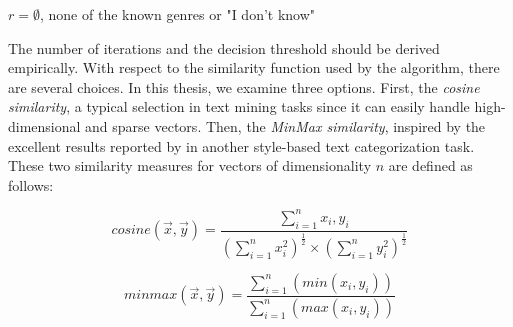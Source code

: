 \begin{algorithm}[t]
\caption{The \textit{RFSE} algorithm.}\label{chap:openset:sec:alg:RFS-Ensemble}

{
      $r = \emptyset$, none of the known genres or "I don't know"\;
}
\end{algorithm}

The number of iterations and the decision threshold should be derived empirically. With respect to the similarity function used by the algorithm, there are several choices. In this thesis, we examine three options. First, the \textit{cosine similarity}, a typical selection in text mining tasks since it can easily handle high-dimensional and sparse vectors. Then, the \textit{MinMax similarity}, inspired by the excellent results reported by \parencite{koppel2014determining} in another style-based text categorization task. These two similarity measures for vectors of dimensionality $n$ are defined as follows:

\begin{equation}
\label{eq:cosine}
cosine(\vec{x},\vec{y})= \frac{\displaystyle \sum_{i=1}^{n} x_i,y_i}{(\displaystyle \sum_{i=1}^{n} x_i^2)^\frac{1}{2}×(\displaystyle \sum_{i=1}^{n} y_i^2)^\frac{1}{2}}
\end{equation}

\begin{equation}
\label{eq:minmax}
minmax(\vec{x},\vec{y})=\frac{\displaystyle \sum_{i=1}^{n}(min(x_i,y_i))}{\displaystyle \sum_{i=1}^{n} (max(x_i,y_i))}	\end{equation}

